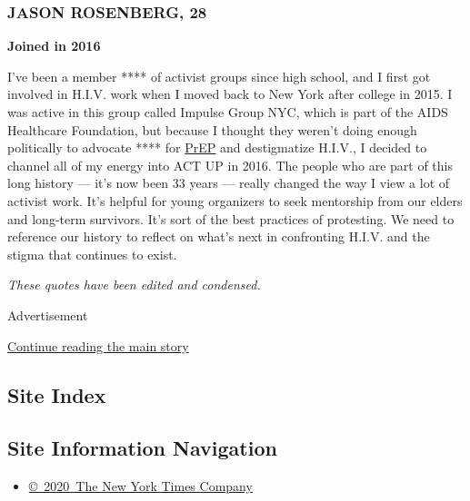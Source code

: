 \hypertarget{jason-rosenberg-28}{%
\subsubsection{JASON ROSENBERG, 28}\label{jason-rosenberg-28}}

\textbf{Joined in 2016}

I've been a member **** of activist groups since high school, and I
first got involved in H.I.V. work when I moved back to New York after
college in 2015. I was active in this group called Impulse Group NYC,
which is part of the AIDS Healthcare Foundation, but because I thought
they weren't doing enough politically to advocate **** for
\href{https://www.cdc.gov/hiv/basics/prep.html}{PrEP} and destigmatize
H.I.V., I decided to channel all of my energy into ACT UP in 2016. The
people who are part of this long history --- it's now been 33 years ---
really changed the way I view a lot of activist work. It's helpful for
young organizers to seek mentorship from our elders and long-term
survivors. It's sort of the best practices of protesting. We need to
reference our history to reflect on what's next in confronting H.I.V.
and the stigma that continues to exist.

\emph{These quotes have been edited and condensed.}

Advertisement

\protect\hyperlink{after-bottom}{Continue reading the main story}

\hypertarget{site-index}{%
\subsection{Site Index}\label{site-index}}

\hypertarget{site-information-navigation}{%
\subsection{Site Information
Navigation}\label{site-information-navigation}}

\begin{itemize}
\tightlist
\item
  \href{https://help.nytimes.com/hc/en-us/articles/115014792127-Copyright-notice}{©~2020~The
  New York Times Company}
\end{itemize}

